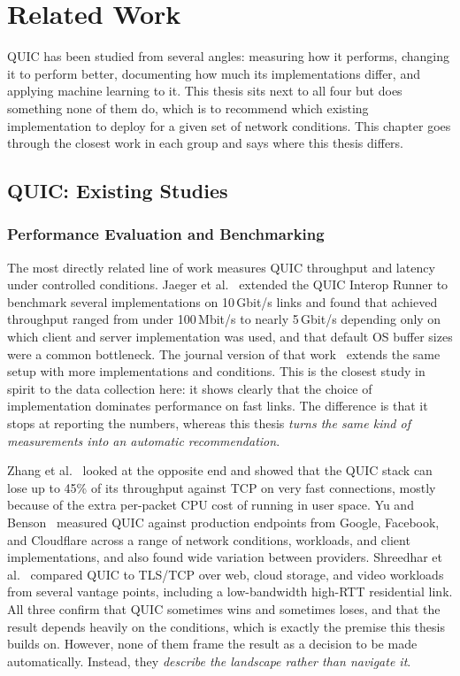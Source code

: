 \chapter{Related Work}
\label{chapter:rel-work}

QUIC has been studied from several angles: measuring how it performs, changing
it to perform better, documenting how much its implementations differ, and
applying machine learning to it. This thesis sits next to all four but does
something none of them do, which is to recommend which existing implementation
to deploy for a given set of network conditions. This chapter goes through the
closest work in each group and says where this thesis differs.

\section{QUIC: Existing Studies}
\label{sec:rw-studies}

\subsection{Performance Evaluation and Benchmarking}
\label{subsec:rw-benchmarking}

The most directly related line of work measures QUIC throughput and latency
under controlled conditions. Jaeger et al.~\cite{jaeger2023quic} extended the
QUIC Interop Runner to benchmark several implementations on 10\,Gbit/s links
and found that achieved throughput ranged from under 100\,Mbit/s to nearly
5\,Gbit/s depending only on which client and server implementation was used,
and that default OS buffer sizes were a common bottleneck. The journal version
of that work~\cite{kempf2024quic} extends the same setup with more
implementations and conditions. This is the closest study in spirit to the
data collection here: it shows clearly that the choice of implementation
dominates performance on fast links. The difference is that it stops at
reporting the numbers, whereas this thesis \emph{turns the same kind of
measurements into an automatic recommendation}.

Zhang et al.~\cite{zhang2024quic} looked at the opposite end and showed that
the QUIC stack can lose up to 45\% of its throughput against TCP on very fast
connections, mostly because of the extra per-packet CPU cost of running in
user space. Yu and Benson~\cite{yu2021dissecting} measured QUIC against
production endpoints from Google, Facebook, and Cloudflare across a range of
network conditions, workloads, and client implementations, and also found wide
variation between providers. Shreedhar et al.~\cite{shreedhar2022evaluating}
compared QUIC to TLS/TCP over web, cloud storage, and video workloads from
several vantage points, including a low-bandwidth high-RTT residential link.
All three confirm that QUIC sometimes wins and sometimes loses, and that the
result depends heavily on the conditions, which is exactly the premise this
thesis builds on. However, none of them frame the result as a decision to be
made automatically. Instead, they \emph{describe the landscape rather than
navigate it}.

